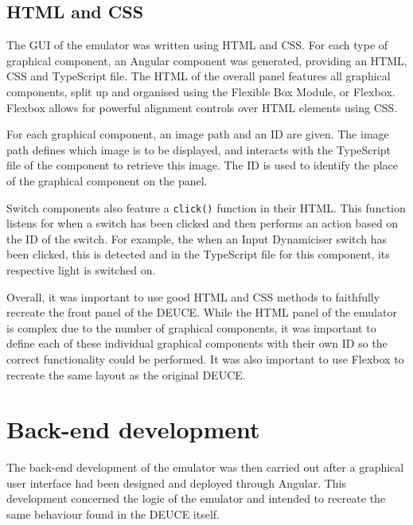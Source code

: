 \documentclass{l4proj}
\begin{document}
\subsection{HTML and CSS}
The GUI of the emulator was written using HTML and CSS. For each type of graphical component, an Angular component was generated, providing an HTML, CSS and TypeScript file. The HTML of the overall panel features all graphical components, split up and organised using the Flexible Box Module, or Flexbox. Flexbox allows for powerful alignment controls over HTML elements using CSS. 

For each graphical component, an image path and an ID are given. The image path defines which image is to be displayed, and interacts with the TypeScript file of the component to retrieve this image. The ID is used to identify the place of the graphical component on the panel.

Switch components also feature a \texttt{click()} function in their HTML. This function listens for when a switch has been clicked and then performs an action based on the ID of the switch. For example, the when an Input Dynamiciser switch has been clicked, this is detected and in the TypeScript file for this component, its respective light is switched on.

Overall, it was important to use good HTML and CSS methods to faithfully recreate the front panel of the DEUCE. While the HTML panel of the emulator is complex due to the number of graphical components, it was important to define each of these individual graphical components with their own ID so the correct functionality could be performed. It was also important to use Flexbox to recreate the same layout as the original DEUCE.

\section{Back-end development}
The back-end development of the emulator was then carried out after a graphical user interface had been designed and deployed through Angular. This development concerned the logic of the emulator and intended to recreate the same behaviour found in the DEUCE itself.
\end{document}
